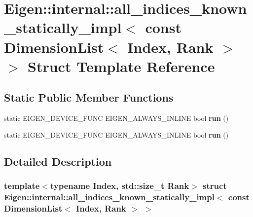 \hypertarget{struct_eigen_1_1internal_1_1all__indices__known__statically__impl_3_01const_01_dimension_list_3_01_index_00_01_rank_01_4_01_4}{}\section{Eigen\+:\+:internal\+:\+:all\+\_\+indices\+\_\+known\+\_\+statically\+\_\+impl$<$ const Dimension\+List$<$ Index, Rank $>$ $>$ Struct Template Reference}
\label{struct_eigen_1_1internal_1_1all__indices__known__statically__impl_3_01const_01_dimension_list_3_01_index_00_01_rank_01_4_01_4}
\subsection*{Static Public Member Functions}
\begin{DoxyCompactItemize}
\item 
\mbox{\label{struct_eigen_1_1internal_1_1all__indices__known__statically__impl_3_01const_01_dimension_list_3_01_index_00_01_rank_01_4_01_4_a474283247352d37827edcea16b13e9ed}} 
static E\+I\+G\+E\+N\+\_\+\+D\+E\+V\+I\+C\+E\+\_\+\+F\+U\+NC E\+I\+G\+E\+N\+\_\+\+A\+L\+W\+A\+Y\+S\+\_\+\+I\+N\+L\+I\+NE bool {\bfseries run} ()
\item 
\mbox{\label{struct_eigen_1_1internal_1_1all__indices__known__statically__impl_3_01const_01_dimension_list_3_01_index_00_01_rank_01_4_01_4_a474283247352d37827edcea16b13e9ed}} 
static E\+I\+G\+E\+N\+\_\+\+D\+E\+V\+I\+C\+E\+\_\+\+F\+U\+NC E\+I\+G\+E\+N\+\_\+\+A\+L\+W\+A\+Y\+S\+\_\+\+I\+N\+L\+I\+NE bool {\bfseries run} ()
\end{DoxyCompactItemize}


\subsection{Detailed Description}
\subsubsection*{template$<$typename Index, std\+::size\+\_\+t Rank$>$\newline
struct Eigen\+::internal\+::all\+\_\+indices\+\_\+known\+\_\+statically\+\_\+impl$<$ const Dimension\+List$<$ Index, Rank $>$ $>$}



